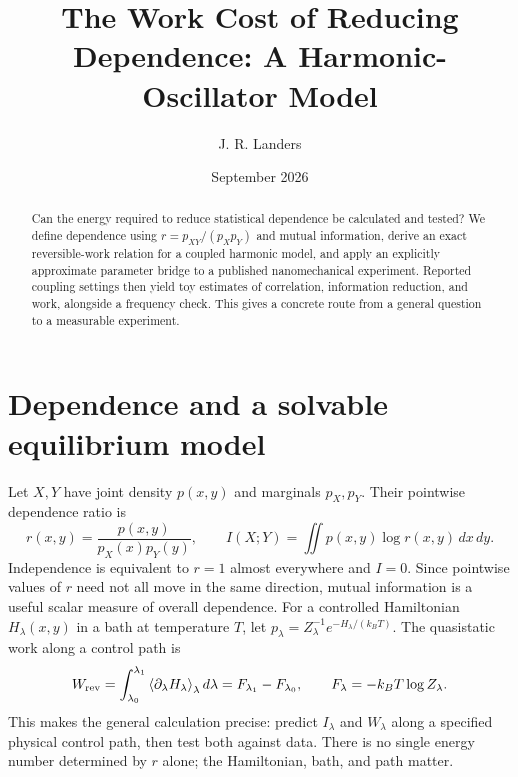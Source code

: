 \documentclass[9pt]{article}
\title{The Work Cost of Reducing Dependence: A Harmonic-Oscillator Model}
\author{J. R. Landers}
\date{September 2026}
\begin{document}
\maketitle
\vspace{-1em}
\begin{abstract}
Can the energy required to reduce statistical dependence be calculated and tested? We define dependence using $r=p_{XY}/(p_Xp_Y)$ and mutual information, derive an exact reversible-work relation for a coupled harmonic model, and apply an explicitly approximate parameter bridge to a published nanomechanical experiment. Reported coupling settings then yield toy estimates of correlation, information reduction, and work, alongside a frequency check. This gives a concrete route from a general question to a measurable experiment.
\end{abstract}

\section{Dependence and a solvable equilibrium model}
Let $X,Y$ have joint density $p(x,y)$ and marginals $p_X,p_Y$. Their pointwise dependence ratio is
\begin{equation}
 r(x,y)=\frac{p(x,y)}{p_X(x)p_Y(y)},\qquad
 I(X;Y)=\iint p(x,y)\log r(x,y)\,dx\,dy .
\end{equation}
Independence is equivalent to $r=1$ almost everywhere and $I=0$. Since pointwise values of $r$ need not all move in the same direction, mutual information is a useful scalar measure of overall dependence.\cite{parrondo2015,sagawa2010} For a controlled Hamiltonian $H_\lambda(x,y)$ in a bath at temperature $T$, let $p_\lambda=Z_\lambda^{-1}e^{-H_\lambda/(k_BT)}$. The quasistatic work along a control path is
\begin{equation}
 W_{\rm rev}=\int_{\lambda_0}^{\lambda_1}\left\langle\partial_\lambda H_\lambda\right\rangle_\lambda d\lambda=F_{\lambda_1}-F_{\lambda_0},\qquad F_\lambda=-k_BT\log Z_\lambda.
\end{equation}
This makes the general calculation precise: predict $I_\lambda$ and $W_\lambda$ along a specified physical control path, then test both against data.\cite{jarzynski1997} There is no single energy number determined by $r$ alone; the Hamiltonian, bath, and path matter.
\end{document}
